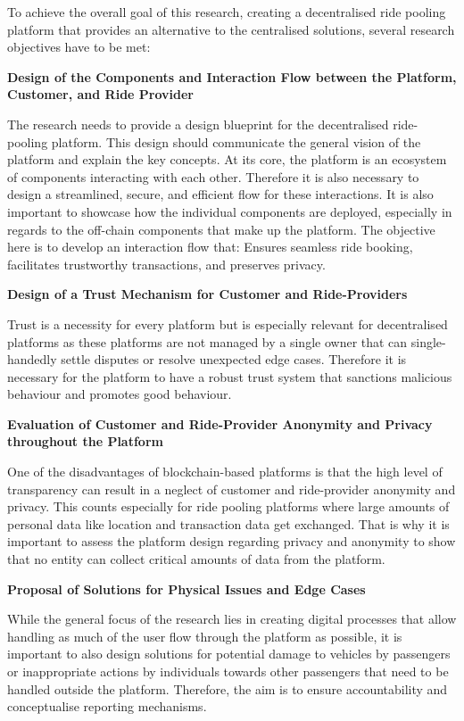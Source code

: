 To achieve the overall goal of this research, creating a decentralised ride pooling platform that provides an alternative to the centralised solutions, several research objectives have to be met:

\textbf{Design of the Components and Interaction Flow between the Platform, Customer, and Ride Provider}

The research needs to provide a design blueprint for the decentralised ride-pooling platform. This design should communicate the general vision of the platform and explain the key concepts.
At its core, the platform is an ecosystem of components interacting with each other. 
Therefore it is also necessary to design a streamlined, secure, and efficient flow for these interactions. It is also important to showcase how the individual components are deployed, especially in regards to the off-chain components that make up the platform. The objective here is to develop an interaction flow that: Ensures seamless ride booking, facilitates trustworthy transactions, and preserves privacy.


\textbf{Design of a Trust Mechanism for Customer and Ride-Providers}

Trust is a necessity for every platform but is especially relevant for decentralised platforms as these platforms are not managed by a single owner that can single-handedly  settle disputes or resolve unexpected edge cases. Therefore it is necessary for the platform to have a robust trust system that sanctions malicious behaviour and promotes  good behaviour.


\textbf{Evaluation of Customer and Ride-Provider Anonymity and Privacy throughout the Platform}

One of the disadvantages of blockchain-based platforms is that the high level of transparency can result in a neglect of customer and ride-provider anonymity and privacy. This counts especially for ride pooling platforms where large amounts of personal data like location and transaction data get exchanged. That is why it is important to assess the platform design regarding privacy and anonymity to show that no entity can collect critical amounts of data from the platform.


\textbf{Proposal of Solutions for Physical Issues and Edge Cases}

While the general focus of the research lies in creating digital processes that allow handling as much of the user flow through the platform as possible, it is important to also design solutions for  potential damage to vehicles by passengers or inappropriate actions by individuals towards other passengers that need to be handled outside the platform. Therefore, the aim is to ensure accountability and conceptualise reporting mechanisms.

